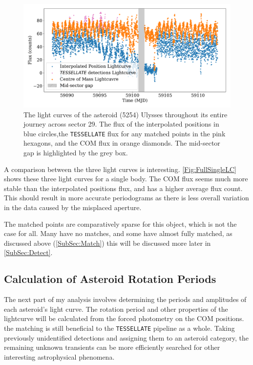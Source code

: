 \documentclass{UCreport}
\begin{document}
\begin{figure}
  \centering
  \includegraphics[width =\textwidth]{./Figures/SingleBodyLCUlyssesgapSpan.pdf}
  \caption[Light curves Example]{The light curves of the asteroid (5254) Ulysses throughout its entire journey across sector 29.
    The flux of the interpolated positions in blue circles,the \texttt{TESSELLATE} flux for any matched points in the pink hexagons, and the COM flux in orange diamonds.
    The mid-sector gap is highlighted by the grey box.}
  \label{Fig:FullSingleLC}
\end{figure}

A comparison between the three light curves is interesting.
\autoref{Fig:FullSingleLC} shows these three light curves for a single body.
The COM flux seems much more stable than the interpolated positions flux, and has a higher average flux count.
This should result in more accurate periodograms as there is less overall variation in the data caused by the misplaced aperture.

The matched points are comparatively sparse for this object, which is not the case for all.
Many have no matches, and some have almost fully matched, as discussed above (\autoref{SubSec:Match}) this will be discussed more later in \autoref{SubSec:Detect}.



\subsection{Calculation of Asteroid Rotation Periods}\label{SubSec:Periods}

The next part of my analysis involves determining the periods and amplitudes of each asteroid's light curve.
The rotation period and other properties of the lightcurve will be calculated from the forced photometry on the COM positions. the matching is still beneficial to the \texttt{TESSELLATE} pipeline as a whole.
Taking previously unidentified detections and assigning them to an asteroid category, the remaining unknown transients can be more efficiently searched for other interesting astrophysical phenomena.
\end{document}
